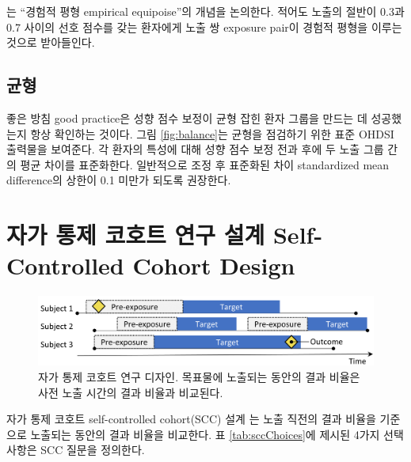 \documentclass[10.5pt]{book}
\theoremstyle{definition}
\theoremstyle{definition}
\theoremstyle{definition}
\theoremstyle{remark}
\begin{document}
\citet{walker_2013} 는 ``경험적 평형 empirical equipoise''의 개념을
논의한다. 적어도 노출의 절반이 0.3과 0.7 사이의 선호 점수를 갖는
환자에게 노출 쌍 exposure pair이 경험적 평형을 이루는 것으로 받아들인다.

\subsection{균형}

 

좋은 방침 good practice은 성향 점수 보정이 균형 잡힌 환자 그룹을 만드는
데 성공했는지 항상 확인하는 것이다. 그림 \ref{fig:balance}는 균형을
점검하기 위한 표준 OHDSI 출력물을 보여준다. 각 환자의 특성에 대해 성향
점수 보정 전과 후에 두 노출 그룹 간의 평균 차이를 표준화한다. 일반적으로
조정 후 표준화된 차이 standardized mean difference의 상한이 0.1 미만가
되도록 권장한다. \citep{rubin_2001}

\section{자가 통제 코호트 연구 설계 Self-Controlled Cohort
Design}\label{-----self-controlled-cohort-design}


\begin{figure}[h]

{\centering \includegraphics[width=0.9\linewidth]{images/PopulationLevelEstimation/selfControlledCohort} 

}

\caption{자가 통제 코호트 연구 디자인. 목표물에 노출되는 동안의 결과 비율은 사전 노출 시간의 결과 비율과 비교된다.}\label{fig:scc}
\end{figure}

자가 통제 코호트 self-controlled cohort(SCC) 설계 \citep{ryan_2013} 는
노출 직전의 결과 비율을 기준으로 노출되는 동안의 결과 비율을 비교한다.
표 \ref{tab:sccChoices}에 제시된 4가지 선택 사항은 SCC 질문을
정의한다.
\end{document}
